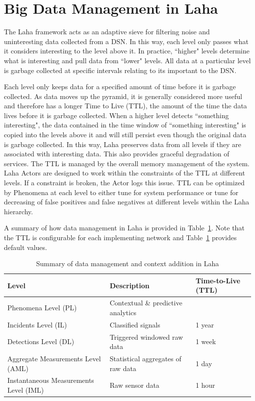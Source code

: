 \section{Big Data Management in Laha} \label{sec:big-data-management}
The Laha framework acts as an adaptive sieve for filtering noise and uninteresting data collected from a DSN. In this way, each level only passes what it considers interesting to the level above it. In practice, ``higher" levels determine what is interesting and pull data from ``lower" levels. All data at a particular level is garbage collected at specific intervals relating to its important to the DSN\@.

Each level only keeps data for a specified amount of time before it is garbage collected. As data moves up the pyramid, it is generally considered more useful and therefore has a longer Time to Live (TTL), the amount of the time the data lives before it is garbage collected.  When a higher level detects ``something interesting", the data contained in the time window of ``something interesting" is copied into the levels above it and will still persist even though the original data is garbage collected. In this way, Laha preserves data from all levels if they are associated with interesting data. This also provides graceful degradation of services. The TTL is managed by the overall memory management of the system. Laha Actors are designed to work within the constraints of the TTL at different levels. If a constraint is broken, the Actor logs this issue. TTL can be optimized by Phenomena at each level to either tune for system performance or tune for decreasing of false positives and false negatives at different levels within the Laha hierarchy.

A summary of how data management in Laha is provided in Table~\ref{data-managament-table}. Note that the TTL is configurable for each implementing network and Table~\ref{data-managament-table} provides default values.

\begin{table}[h]
	\centering
	\begin{tabularx}{\textwidth}{lXl}
		\toprule
		\textbf{Level} & \textbf{Description} & \textbf{Time-to-Live (TTL)} \\
		\midrule
		Phenomena Level (PL) & Contextual \& predictive analytics &  \\
		Incidents Level (IL) & Classified signals &  1 year \\
		Detections Level (DL) & Triggered windowed raw data & 1 week  \\
		Aggregate Measurements Level (AML) & Statistical aggregates of raw data  & 1 day  \\
		Instantaneous Measurements Level (IML) & Raw sensor data  & 1 hour \\
		\bottomrule
	\end{tabularx}
    \label{data-managament-table}
	\caption{Summary of data management and context addition in Laha}
\end{table}

